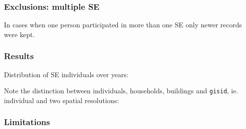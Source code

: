 \documentclass[a4paper, notitlepage, fleqn]{article} %
\begin{document}
\subsubsection{Exclusions: multiple SE}

In cases when one person participated in more than one SE only newer records were kept.  
\begin{stlog}\end{stlog}
\subsubsection{Results}
Distribution of SE individuals over years:
\begin{stlog}\end{stlog}
Note the distinction between individuals, households, buildings and \texttt{gisid}, ie. individual and two spatial resolutions:
\begin{stlog}\end{stlog}
\subsubsection{Limitations}
\end{document}
